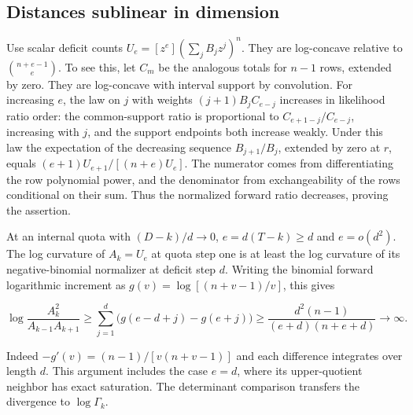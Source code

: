 \subsection{Distances sublinear in dimension}

Use scalar deficit counts $U_e=[z^e](\sum_j B_j z^j)^n$. They are log-concave relative to $\binom{n+e-1}e$. To see this, let $C_m$ be the analogous totals for $n-1$ rows, extended by zero. They are log-concave with interval support by convolution. For increasing $e$, the law on $j$ with weights $(j+1)B_j C_{e-j}$ increases in likelihood ratio order: the common-support ratio is proportional to $C_{e+1-j}/C_{e-j}$, increasing with $j$, and the support endpoints both increase weakly. Under this law the expectation of the decreasing sequence $B_{j+1}/B_j$, extended by zero at $r$, equals $(e+1)U_{e+1}/[(n+e)U_e]$. The numerator comes from differentiating the row polynomial power, and the denominator from exchangeability of the rows conditional on their sum. Thus the normalized forward ratio decreases, proving the assertion.

At an internal quota with $(D-k)/d\to0$, $e=d(T-k)\ge d$ and $e=o(d^2)$. The log curvature of $A_k=U_e$ at quota step one is at least the log curvature of its negative-binomial normalizer at deficit step $d$. Writing the binomial forward logarithmic increment as $g(v)=\log[(n+v-1)/v]$, this gives

\begin{equation*}
\log\frac{A_k^2}{A_{k-1}A_{k+1}}
\ge\sum_{j=1}^d \big(g(e-d+j)-g(e+j)\big)
\ge\frac{d^2(n-1)}{(e+d)(n+e+d)}\longrightarrow\infty .
\end{equation*}

Indeed $-g'(v)=(n-1)/[v(n+v-1)]$ and each difference integrates over length $d$. This argument includes the case $e=d$, where its upper-quotient neighbor has exact saturation. The determinant comparison transfers the divergence to $\log\Gamma_k$.
